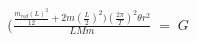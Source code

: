 \documentclass[preview]{standalone}
\begin{document}
\begin{align*}
(\frac{\frac{m_{rod}(L)^2}{12}+2m(\frac{L}{2})^2)(\frac{2\pi}{T})^2\theta r^2}{LMm} \;=\; G
\end{align*}
\end{document}
